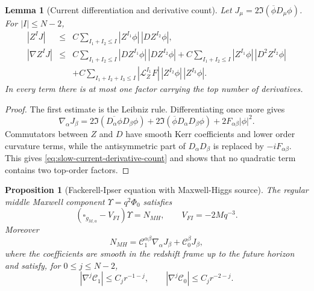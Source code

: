 \documentclass[11pt]{article}
\numberwithin{equation}{section}
\theoremstyle{plain}
\newtheorem{proposition}[theorem]{Proposition}
\newtheorem{lemma}[theorem]{Lemma}
\theoremstyle{definition}
\theoremstyle{remark}
\begin{document}
\begin{lemma}[Current differentiation and derivative count]\label{lem:slow-current-derivatives}
Let \(J_\mu=2\Im(\overline\phi D_\mu\phi)\).  For \(|I|\le N-2\),
\begin{eqnarray}\label{eq:slow-current-derivative-count}
|Z^I J|
&\le&
C\sum_{I_1+I_2\le I}|Z^{I_1}\phi|\,|D Z^{I_2}\phi|,
\nonumber\\
|\nabla Z^I J|
&\le&
C\sum_{I_1+I_2\le I}|D Z^{I_1}\phi|\,|D Z^{I_2}\phi|
+C\sum_{I_1+I_2\le I}|Z^{I_1}\phi|\,|D^2 Z^{I_2}\phi|
\nonumber\\
&&
+C\sum_{I_1+I_2+I_3\le I}
 |\mathcal L_Z^{I_1}F|\,|Z^{I_2}\phi|\,|Z^{I_3}\phi|.
\end{eqnarray}
In every term there is at most one factor carrying the top number of derivatives.
\end{lemma}

\begin{proof}
The first estimate is the Leibniz rule.  Differentiating once more gives
\begin{equation}\label{eq:nabla-current-identity-slow}
 \nabla_\alpha J_\beta
 =2\Im(\overline{D_\alpha\phi}D_\beta\phi)
 +2\Im(\overline\phi D_\alpha D_\beta\phi)
 +2F_{\alpha\beta}|\phi|^2.
\end{equation}
Commutators between \(Z\) and \(D\) have smooth Kerr coefficients and lower order curvature terms, while the antisymmetric part of \(D_\alpha D_\beta\) is replaced by \(-iF_{\alpha\beta}\).  This gives \eqref{eq:slow-current-derivative-count} and shows that no quadratic term contains two top-order factors.
\end{proof}

\begin{proposition}[Fackerell-Ipser equation with Maxwell-Higgs source]\label{prop:slow-FI-source-equation}
The regular middle Maxwell component \(\Upsilon=q^2\Phi_0\) satisfies
\begin{equation}\label{eq:slow-fi-forced}
 (\square_{g_{M,a}}-V_{FI})\Upsilon=N_{MH},
 \qquad
 V_{FI}=-2Mq^{-3}.
\end{equation}
Moreover
\begin{equation}\label{eq:slow-NMH-structure}
 N_{MH}=\mathcal C_1^{\alpha\beta}\nabla_\alpha J_\beta+\mathcal C_0^\beta J_\beta,
\end{equation}
where the coefficients are smooth in the redshift frame up to the future horizon and satisfy, for \(0\le j\le N-2\),
\begin{equation}\label{eq:slow-fi-coeff-decay}
 |\nabla^j\mathcal C_1|\le C_j r^{-1-j},
 \qquad
 |\nabla^j\mathcal C_0|\le C_j r^{-2-j}.
\end{equation}
\end{proposition}
\end{document}
